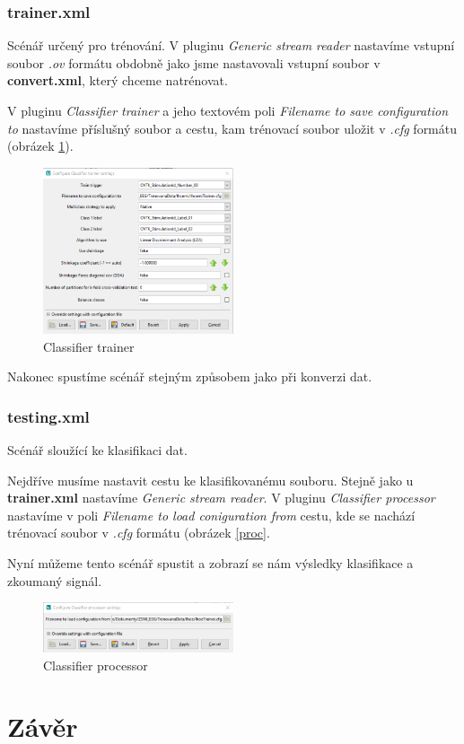 \documentclass{report}
\begin{document}
\subsection{trainer.xml}
Scénář určený pro trénování. V pluginu \textit{Generic stream reader} nastavíme vstupní soubor \textit{.ov} formátu obdobně jako jsme nastavovali vstupní soubor v \textbf{convert.xml}, který chceme natrénovat.

V pluginu \textit{Classifier trainer} a jeho textovém poli \textit{Filename to save configuration to} nastavíme příslušný soubor a cestu, kam trénovací soubor uložit v \textit{.cfg} formátu (obrázek \ref{fig:trainer}).

  \begin{figure}[!ht]
\centering
  \includegraphics[width=0.5\textwidth]{pictures/trainer.png}
  \caption{Classifier trainer}
  \label{fig:trainer}
 \end{figure}

Nakonec spustíme scénář stejným způsobem jako při konverzi dat.
\subsection{testing.xml}
Scénář sloužící ke klasifikaci dat.

Nejdříve musíme nastavit cestu ke klasifikovanému souboru. Stejně jako u \textbf{trainer.xml} nastavíme \textit{Generic stream reader}.
V pluginu \textit{Classifier processor} nastavíme v poli \textit{Filename to load coniguration from} cestu, kde se nachází trénovací soubor v \textit{.cfg} formátu (obrázek \ref{proc}.

Nyní můžeme tento scénář spustit a zobrazí se nám výsledky klasifikace a zkoumaný signál.

  \begin{figure}[!ht]
\centering
  \includegraphics[width=0.5\textwidth]{pictures/processorclass.png}
  \caption{Classifier processor}
  \label{fig:btns}
 \end{figure}


\chapter{Závěr}
\end{document}
